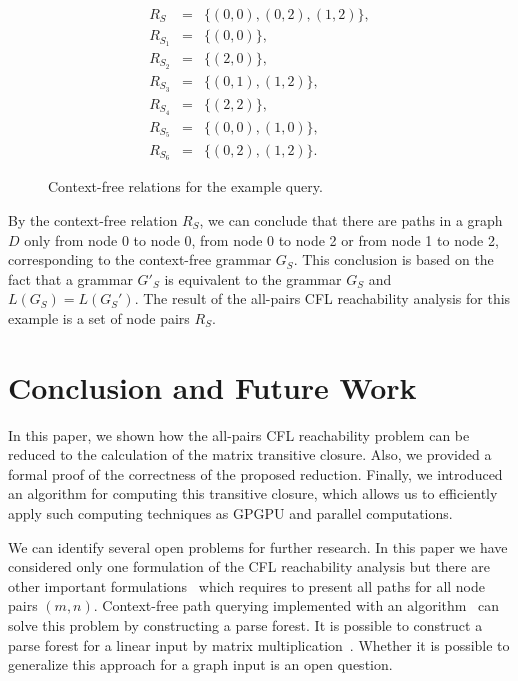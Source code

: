 \documentclass[runningheads,a4paper]{llncs}
\begin{document}
\begin{figure}[h]
	\begin{eqnarray*}
		R_S&=&\{(0,0),(0,2),(1,2)\},\\
		R_{S_1}&=&\{(0,0)\},\\
		R_{S_2}&=&\{(2,0)\}, \\
		R_{S_3}&=&\{(0,1), (1,2)\}, \\
		R_{S_4}&=&\{(2,2)\}, \\
		R_{S_5}&=&\{(0,0), (1,0)\}, \\
		R_{S_6}&=&\{(0,2), (1,2)\}.
	\end{eqnarray*}
	\caption{Context-free relations for the example query.}
	\label{ExampleQueryCFRelations}
\end{figure}

By the context-free relation $R_S$, we can conclude that there are paths in a graph $D$ only from node 0 to node 0, from node 0 to node 2 or from node 1 to node 2, corresponding to the context-free grammar $G_S$. This conclusion is based on the fact that a grammar $G'_S$ is equivalent to the grammar $G_S$ and $L(G_S) = L(G_S')$. The result of the all-pairs CFL reachability analysis for this example is a set of node pairs $R_S$.


\section{Conclusion and Future Work}%
In this paper, we shown how the all-pairs CFL reachability problem can be reduced to the calculation of the matrix transitive closure. Also, we provided a formal proof of the correctness of the proposed reduction. Finally, we introduced an algorithm for computing this transitive closure, which allows us to efficiently apply such computing techniques as GPGPU and parallel computations.

We can identify several open problems for further research. In this paper we have considered only one formulation of the CFL reachability analysis but there are other important formulations~\cite{hellingsPathQuerying} which requires to present all paths for all node pairs $(m,n)$. Context-free path querying implemented with an algorithm~\cite{GLL} can solve this problem by constructing a parse forest. It is possible to construct a parse forest for a linear input by matrix multiplication~\cite{okhotin_cyk}. Whether it is possible to generalize this approach for a graph input is an open question.
\end{document}
